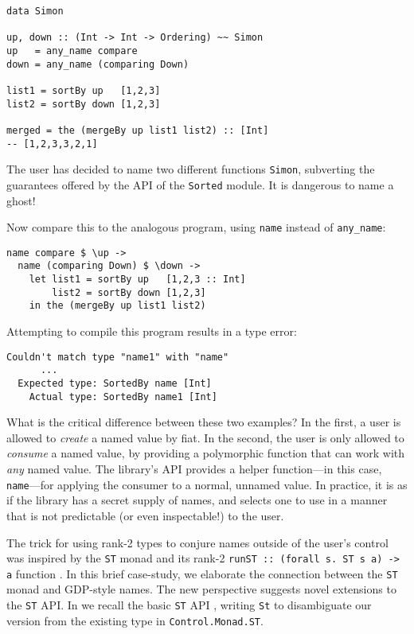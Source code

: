 \documentclass[format=sigplan, review=false, screen=true, 10pt]{acmart}
\makeatletter
\let\origsection\section
\renewcommand\section{\@ifstar{\starsection}{\nostarsection}}
\newcommand\nostarsection[1]
{\sectionprelude\origsection{#1}\sectionpostlude}
\newcommand\starsection[1]
{\sectionprelude\origsection*{#1}\sectionpostlude}
\newcommand\sectionprelude{%
  \vspace{-0.5em}
}
\newcommand\sectionpostlude{%
  \vspace{0em}
}
\makeatother
\begin{document}
\begin{verbatim}
data Simon
  
up, down :: (Int -> Int -> Ordering) ~~ Simon
up   = any_name compare
down = any_name (comparing Down)

list1 = sortBy up   [1,2,3]
list2 = sortBy down [1,2,3]

merged = the (mergeBy up list1 list2) :: [Int]
-- [1,2,3,3,2,1]
\end{verbatim}
\noindent
The user has decided to name two different functions \texttt{Simon}, subverting the
guarantees offered by the API of the \texttt{Sorted} module. It is dangerous to
name a ghost!

Now compare this to the analogous program, using \texttt{name} instead of \texttt{any\_name}:
\begin{verbatim}
name compare $ \up ->
  name (comparing Down) $ \down ->
    let list1 = sortBy up   [1,2,3 :: Int]
        list2 = sortBy down [1,2,3]
    in the (mergeBy up list1 list2)
\end{verbatim}
\noindent
Attempting to compile this program results in a type error:

\begin{lstlisting}
Couldn't match type "name1" with "name"
      ...
  Expected type: SortedBy name [Int]
    Actual type: SortedBy name1 [Int]
\end{lstlisting}
\noindent
What is the critical difference between these two examples? In the first, a user is
allowed to \emph{create} a named value by fiat. In the second, the user is only allowed to \emph{consume} a named value, by
providing a polymorphic function that can work with \emph{any} named value. The library's API provides
a helper function---in this case, \texttt{name}---for applying the consumer to a normal, unnamed value.
In practice, it is as if the
library has a secret supply of names, and selects one to use in a manner that is not
predictable (or even inspectable!) to the user.


\section{Case Study \#2: Sharing state threads}
The trick for using rank-2 types to conjure names outside of the user's control was
inspired by the \texttt{ST} monad and its rank-2 \texttt{runST :: (forall s. ST s a) -> a}
function \cite{launchbury1994lazy}. In this brief case-study, we elaborate the connection
between the \texttt{ST} monad and GDP-style names. The new perspective suggests novel
extensions to the \texttt{ST} API.
In  we recall the basic \texttt{ST} API \cite{launchbury1994lazy}, writing \texttt{St} to
disambiguate our version from the existing type in \texttt{Control.Monad.ST}.
\end{document}
